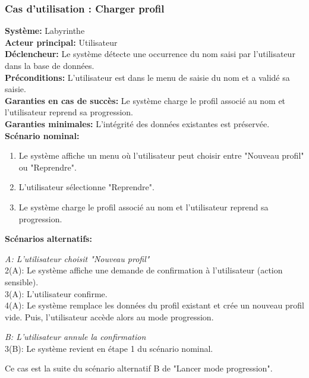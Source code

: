\documentclass{butexFR}
\begin{document}
\subsubsection{Cas d'utilisation : Charger profil}
\textbf{Système:} Labyrinthe\\
\textbf{Acteur principal:} Utilisateur\\
\textbf{Déclencheur:} Le système détecte une occurrence du nom saisi par l'utilisateur dans la base de données.\\
\textbf{Préconditions:} L'utilisateur est dans le menu de saisie du nom et a validé sa saisie.\\
\textbf{Garanties en cas de succès:} Le système charge le profil associé au nom et l'utilisateur reprend sa progression.\\
\textbf{Garanties minimales:} L'intégrité des données existantes est préservée.\\
\textbf{Scénario nominal:}
\begin{enumerate}
    \item Le système affiche un menu où l'utilisateur peut choisir entre "Nouveau profil" ou "Reprendre".
    \item L'utilisateur sélectionne "Reprendre".
    \item Le système charge le profil associé au nom et l'utilisateur reprend sa progression.
\end{enumerate}

\textbf{Scénarios alternatifs:}

\emph{A: L'utilisateur choisit "Nouveau profil"}\\
\hspace*{1em}2(A): Le système affiche une demande de confirmation à l'utilisateur (action sensible).\\
\hspace*{1em}3(A): L'utilisateur confirme.\\
\hspace*{1em}4(A): Le système remplace les données du profil existant et crée un nouveau profil vide. Puis, l'utilisateur accède alors au mode progression.

\emph{B: L'utilisateur annule la confirmation}\\
\hspace*{1em}3(B): Le système revient en étape 1 du scénario nominal.

\vspace{1.5em}

Ce cas est la suite du scénario alternatif B de "Lancer mode progression".
\end{document}

